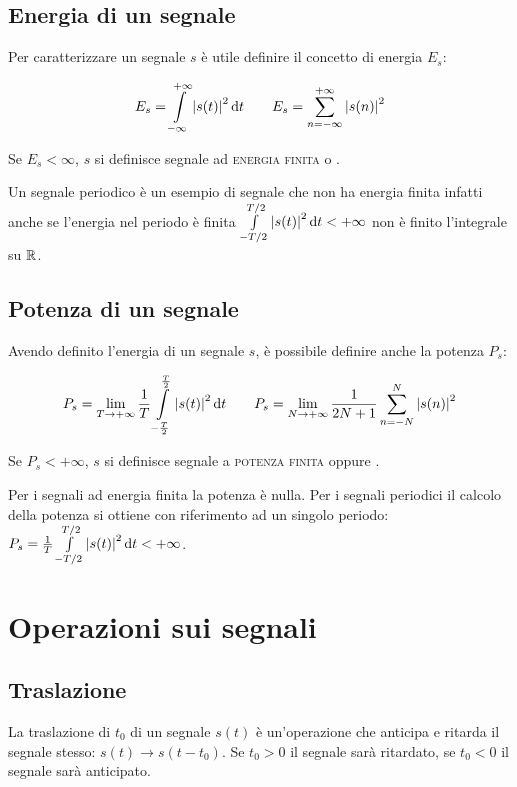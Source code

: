 \subsection{Energia di un segnale}
Per caratterizzare un segnale $s$ è utile definire il concetto di energia $E_s$:

\begin{equation}\label{eq:segnale_energia}
E_s=\int\limits_{-\infty}^{+\infty}{\left|{s(t)}\right|^2}{\,\mathop{}\!\mathrm{d}{t}} \qquad E_s=\sum_{n=-\infty}^{+\infty}\left|{s(n)}\right|^2
\end{equation}

Se $E_s < \infty$, $s$  si definisce segnale ad \textsc{energia finita} o .

Un segnale periodico è un esempio di segnale che non ha energia finita infatti anche se l'energia nel periodo è finita $\int\limits_{-T/2}^{T/2}{\left|{s(t)}\right|^2}{\,\mathop{}\!\mathrm{d}{t}}<+\infty$ non è finito l'integrale su $\mathbb{R}$.

\subsection{Potenza di un segnale}
Avendo definito l'energia di un segnale $s$, è possibile definire anche la potenza $P_s$:

\begin{equation}\label{eq:segnale_potenza}
P_s=\lim\limits_{T\to+\infty}{\frac{1}{T}\int\limits_{-\frac{T}{2}}^{\frac{T}{2}}{\left|{s(t)}\right|^2}{\,\mathop{}\!\mathrm{d}{t}}}\qquad
P_s=\lim\limits_{N\to+\infty}{\frac{1}{2N+1}\sum_{n=-N}^{N}{\left|{s(n)}\right|^2}}
\end{equation}

Se $P_s<+\infty$, $s$ si definisce segnale a \textsc{potenza finita} oppure .

Per i segnali ad energia finita la potenza è nulla. Per i segnali periodici il calcolo della potenza si ottiene con riferimento ad un singolo periodo: $P_s=\frac{1}{T}\int\limits_{-T/2}^{T/2}{\left|{s(t)}\right|^2}{\,\mathop{}\!\mathrm{d}{t}}<+\infty$.

\section{Operazioni sui segnali}
\subsection{Traslazione}
La traslazione di $t_0$ di un segnale $s(t)$ è un'operazione che anticipa e ritarda il segnale stesso:
$s(t) \to s(t-t_0)$. Se $t_0>0$ il segnale sarà ritardato, se $t_0<0$ il segnale sarà anticipato.
